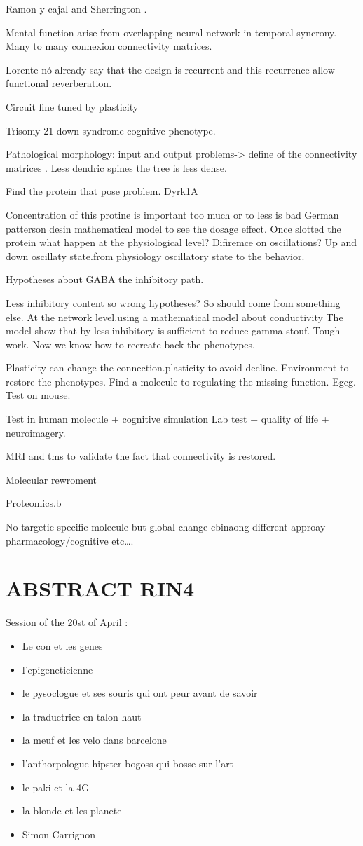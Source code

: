 \documentclass[10pt,letterpaper]{article}
\begin{document}
Ramon y cajal and Sherrington .

Mental function arise from overlapping neural network in temporal syncrony. Many to many connexion connectivity matrices.

Lorente nó already say that the design is recurrent and this recurrence allow functional reverberation.

Circuit fine tuned by plasticity

Trisomy 21 down syndrome cognitive phenotype.

Pathological morphology: input and output problems-> define of the connectivity matrices .
Less dendric spines the tree is less dense.

Find the protein that pose problem. Dyrk1A

Concentration of this protine is important too much or to less is bad
German patterson desin mathematical model to see the dosage effect.
Once slotted the protein what happen at the physiological level?
Difiremce on oscillations?
Up and down oscillaty state.from physiology oscillatory state to the behavior.

Hypotheses about GABA the inhibitory path.

Less inhibitory content so wrong hypotheses? So should come from something else.
At the network level.using a mathematical model about conductivity
The model show that by less inhibitory is sufficient to reduce gamma stouf. Tough work.
Now we know how to recreate back the phenotypes.

Plasticity can change the connection.plasticity to avoid decline. Environment to restore the phenotypes.
Find a molecule to regulating the missing function. Egcg. Test on mouse.

Test in human molecule + cognitive simulation
Lab test + quality of life + neuroimagery.

MRI and tms to validate the fact that connectivity is restored.

Molecular rewroment

Proteomics.b

No targetic specific molecule but global change cbinaong different approay pharmacology/cognitive etc\ldots.


\section{ABSTRACT RIN4}
Session of the 20st of April :

\begin{itemize}
    \item Le con et les genes
    \item l'epigeneticienne
    \item le pysoclogue et ses souris qui ont peur avant de savoir
    \item la traductrice en talon haut
    \item la meuf et les velo dans barcelone
    \item l'anthorpologue hipster bogoss qui bosse sur l'art
    \item le paki et la 4G
    \item la blonde et les planete
    \item Simon Carrignon
\end{itemize}
\end{document}
